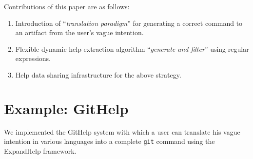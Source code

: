 \documentclass{sigchi}
\def\GH{\textsf{GitHelp}}
\def\EH{\textsf{ExpandHelp}}
\def\GIT{\texttt{git}}
\begin{document}

Contributions of this paper are as follows:

\begin{enumerate}
\item Introduction of ``\textit{translation paradigm}'' for
  generating a correct command to an artifact from
  the user's vague intention.
\item Flexible dynamic help extraction algorithm
  ``\textit{generate and filter}''
  using regular expressions.
\item Help data sharing infrastructure for the above strategy.
\end{enumerate}

\section{Example: GitHelp}

We implemented the {\GH} system
with which a user can translate his vague intention in various languages
into a complete {\GIT} command
using the {\EH} framework.

\end{document}
